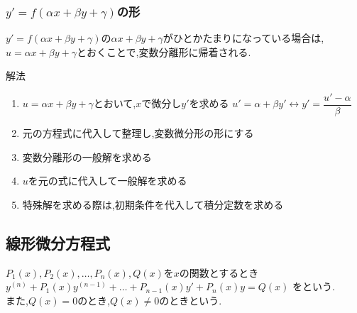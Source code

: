 \documentclass[a4paper]{jsarticle}
\begin{document}
\subsubsection{$y'=f\left(\alpha x+\beta y+\gamma\right)$の形}
$y'=f\left(\alpha x+\beta y+\gamma\right)$の$\alpha x+\beta y+\gamma$がひとかたまりになっている場合は,
$u=\alpha x+\beta y+\gamma$とおくことで,変数分離形に帰着される.
\begin{itembox}[l]{解法}
    \begin{enumerate}[(1)]
        \item $u=\alpha x+\beta y+\gamma$とおいて,$x$で微分し$y'$を求める
              \quad$u'=\alpha+\beta y'\leftrightarrow y'=\dfrac{u'-\alpha}{\beta}$
        \item 元の方程式に代入して整理し,変数微分形の形にする
        \item 変数分離形の一般解を求める
        \item $u$を元の式に代入して一般解を求める
        \item 特殊解を求める際は,初期条件を代入して積分定数を求める
    \end{enumerate}
\end{itembox}
\subsection{線形微分方程式}
$P_1\left(x\right),P_2\left(x\right),\dots,P_n\left(x\right),Q\left(x\right)$を$x$の関数とするとき\\
$y^{\left(n\right)}+P_1\left(x\right)y^{\left(n-1\right)}+\dots+P_{n-1}\left(x\right)y'+P_n\left(x\right)y=Q\left(x\right)$
をという.\\
また,$Q\left(x\right)=0$のとき,$Q\left(x\right)\neq0$のときという.
\end{document}

